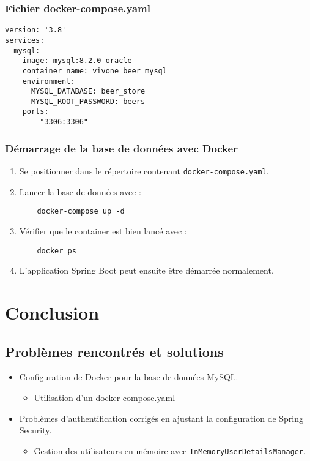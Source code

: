 \documentclass{article}
\begin{document}
\subsubsection{Fichier docker-compose.yaml}
\begin{verbatim}
version: '3.8'
services:
  mysql:
    image: mysql:8.2.0-oracle
    container_name: vivone_beer_mysql
    environment:
      MYSQL_DATABASE: beer_store
      MYSQL_ROOT_PASSWORD: beers
    ports:
      - "3306:3306"
\end{verbatim}

\subsubsection{Démarrage de la base de données avec Docker}
\begin{enumerate}
    \item Se positionner dans le répertoire contenant \texttt{docker-compose.yaml}.
    \item Lancer la base de données avec :
    \begin{verbatim}
    docker-compose up -d
    \end{verbatim}
    \item Vérifier que le container est bien lancé avec :
    \begin{verbatim}
    docker ps
    \end{verbatim}
    \item L'application Spring Boot peut ensuite être démarrée normalement.
\end{enumerate}
\clearpage
\section{Conclusion}

\subsection{Problèmes rencontrés et solutions}
\begin{itemize}
    \item Configuration de Docker pour la base de données MySQL.
            \begin{itemize}
                \item Utilisation d'un docker-compose.yaml
            \end{itemize}
    \item Problèmes d'authentification corrigés en ajustant la configuration de Spring Security.
            \begin{itemize}
                \item Gestion des utilisateurs en mémoire avec \texttt{InMemoryUserDetailsManager}.
            \end{itemize}
\end{itemize}
\end{document}
